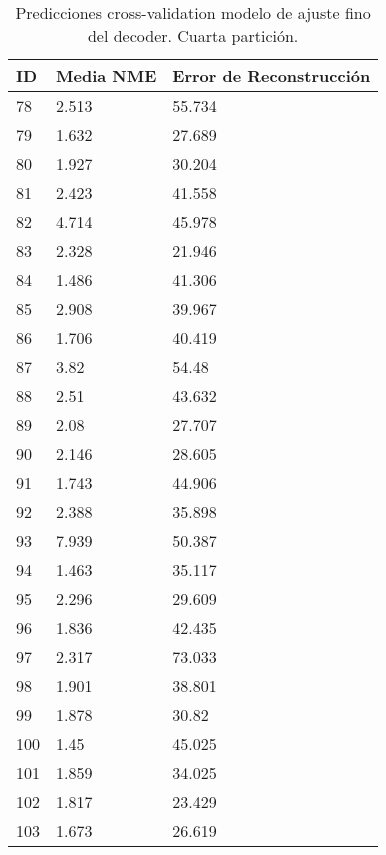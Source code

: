 \begin{table}[!ht]
    \centering
    \caption{Predicciones cross-validation modelo de ajuste fino del  decoder. Cuarta partición.}
    \begin{tabular}{|l|l|l|}
    \hline
    \cellcolor{gray!25}\textbf{ID} & \cellcolor{gray!25}\textbf{Media NME} & \cellcolor{gray!25}\textbf{Error de Reconstrucción} \\ \hline
        78 & 2.513 & 55.734 \\ \hline
        79 & 1.632 & 27.689 \\ \hline
        80 & 1.927 & 30.204 \\ \hline
        81 & 2.423 & 41.558 \\ \hline
        82 & 4.714 & 45.978 \\ \hline
        83 & 2.328 & 21.946 \\ \hline
        84 & 1.486 & 41.306 \\ \hline
        85 & 2.908 & 39.967 \\ \hline
        86 & 1.706 & 40.419 \\ \hline
        87 & 3.82 & 54.48 \\ \hline
        88 & 2.51 & 43.632 \\ \hline
        89 & 2.08 & 27.707 \\ \hline
        90 & 2.146 & 28.605 \\ \hline
        91 & 1.743 & 44.906 \\ \hline
        92 & 2.388 & 35.898 \\ \hline
        93 & 7.939 & 50.387 \\ \hline
        94 & 1.463 & 35.117 \\ \hline
        95 & 2.296 & 29.609 \\ \hline
        96 & 1.836 & 42.435 \\ \hline
        97 & 2.317 & 73.033 \\ \hline
        98 & 1.901 & 38.801 \\ \hline
        99 & 1.878 & 30.82 \\ \hline
        100 & 1.45 & 45.025 \\ \hline
        101 & 1.859 & 34.025 \\ \hline
        102 & 1.817 & 23.429 \\ \hline
        103 & 1.673 & 26.619 \\ \hline
    \end{tabular}
\end{table}

